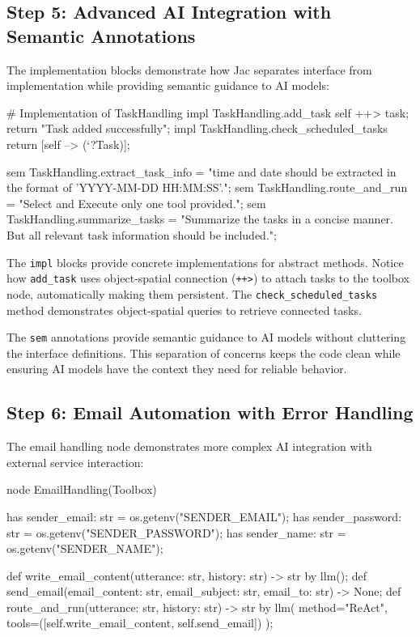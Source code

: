 \subsection{Step 5: Advanced AI Integration with Semantic Annotations}

The implementation blocks demonstrate how Jac separates interface from implementation while providing semantic guidance to AI models:

\begin{jacblock}
# Implementation of TaskHandling
impl TaskHandling.add_task {
    self ++> task;
    return "Task added successfully";
}
impl TaskHandling.check_scheduled_tasks {
    return [self --> (`?Task)];
}

sem TaskHandling.extract_task_info = "time and date should be extracted in the format of 'YYYY-MM-DD HH:MM:SS'.";
sem TaskHandling.route_and_run = "Select and Execute only one tool provided.";
sem TaskHandling.summarize_tasks = "Summarize the tasks in a concise manner. But all relevant task information should be included.";
\end{jacblock}

The \texttt{impl} blocks provide concrete implementations for abstract methods. Notice how \texttt{add\_task} uses object-spatial connection (\texttt{++>}) to attach tasks to the toolbox node, automatically making them persistent. The \texttt{check\_scheduled\_tasks} method demonstrates object-spatial queries to retrieve connected tasks.

The \texttt{sem} annotations provide semantic guidance to AI models without cluttering the interface definitions. This separation of concerns keeps the code clean while ensuring AI models have the context they need for reliable behavior.

\subsection{Step 6: Email Automation with Error Handling}

The email handling node demonstrates more complex AI integration with external service interaction:

\begin{jacblock}
node EmailHandling(Toolbox) {
    has sender_email: str = os.getenv("SENDER_EMAIL");
    has sender_password: str = os.getenv("SENDER_PASSWORD");
    has sender_name: str = os.getenv("SENDER_NAME");

    def write_email_content(utterance: str, history: str) -> str by llm();
    def send_email(email_content: str, email_subject: str, email_to: str) -> None;
    def route_and_run(utterance: str, history: str) -> str by llm(
        method="ReAct",
        tools=([self.write_email_content, self.send_email])
    );
}
\end{jacblock}


